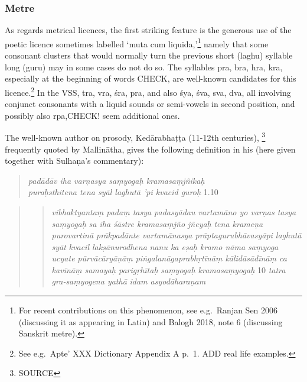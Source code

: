 \documentclass[11pt]{book}
\begin{document}
\subsubsection{Metre}
As regards metrical licences, the first striking feature is the generous
use of the poetic licence sometimes labelled `muta cum
liquida,'\footnote{For recent contributions on this phenomenon, see
  e.g.~Ranjan Sen 2006 (discussing it as appearing in Latin) and Balogh
  2018, note 6 (discussing Sanskrit metre).} namely that some consonant
clusters that would normally turn the previous short (laghu) syllable
long (guru) may in some cases do not do so. The syllables pra, bra, hra,
kra, especially at the beginning of words CHECK, are well-known
candidates for this licence.\footnote{See e.g.~Apte' XXX Dictionary
  Appendix A p.~1. ADD real life examples.} In the VSS, tra, vra, śra,
pra, and also śya, śva, sva, dva, all involving conjunct consonants with
a liquid sounds or semi-vowels in second position, and possibly also
rpa,CHECK! seem additional ones.

The well-known author on prosody, Kedārabhaṭṭa (11-12th centuries),%
		\footnote{SOURCE}	 
frequently quoted by Mallinātha, gives the following definition in his
 (here given together with Sulhaṇa's  commentary):

\begin{quote}
\emph{padādāv iha varṇasya saṃyogaḥ kramasaṃjñikaḥ} \textbar{}\\
\emph{puraḥsthitena tena syāl laghutā 'pi kvacid guroḥ}
\textbar{}\textbar{} 1.10 \textbar{}\textbar{}
\end{quote}

\begin{quote}
\begin{quote}
\emph{vibhaktyantaṃ padaṃ tasya padasyādau vartamāno yo varṇas tasya
saṃyogaḥ} \textbar{} \emph{sa iha śāstre kramasaṃjño jñeyaḥ} \textbar{}
\emph{tena krameṇa purovartinā prākpadānte vartamānasya
prāptagurubhāvasyāpi laghutā syāt} \textbar{} \emph{kvacil
lakṣānurodhena} \textbar{} \emph{nanu ka eṣaḥ kramo nāma saṃyoga ucyate}
\textbar{} \emph{pūrvācāryāṇāṃ piṅgalanāgaprabhṛtīnāṃ kālidāsādīnāṃ ca
kavīnāṃ samayaḥ parigṛhītaḥ} \textbar{} \emph{saṃyogaḥ kramasaṃyogaḥ}
\textbar{}\textbar{} 10 \textbar{}\textbar{} \emph{tatra gra-saṃyogena
yathā} \textbar{} \emph{idam asyodāharaṇam} \textbar{}
\end{quote}
\end{quote}
\end{document}
